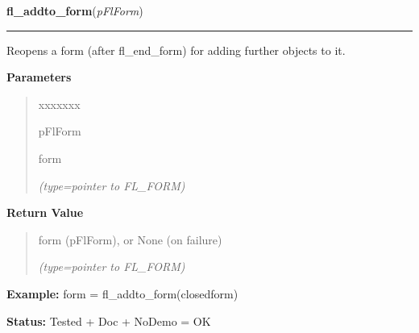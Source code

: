     \label{xformslib:flbasic:fl_addto_form}

    \vspace{0.5ex}

\hspace{.8\funcindent}\begin{boxedminipage}{\funcwidth}

    \raggedright \textbf{fl\_addto\_form}(\textit{pFlForm})

    \vspace{-1.5ex}

    \rule{\textwidth}{0.5\fboxrule}
\setlength{\parskip}{2ex}
    Reopens a form (after fl\_end\_form) for adding further objects to it.

\setlength{\parskip}{1ex}
      \textbf{Parameters}
      \vspace{-1ex}

      \begin{quote}
        \begin{Ventry}{xxxxxxx}

          \item[pFlForm]

          form

            {\it (type=pointer to FL\_FORM)}

        \end{Ventry}

      \end{quote}

      \textbf{Return Value}
    \vspace{-1ex}

      \begin{quote}
      form (pFlForm), or None (on failure)

      {\it (type=pointer to FL\_FORM)}

      \end{quote}

\textbf{Example:} form = fl\_addto\_form(closedform)



\textbf{Status:} Tested + Doc + NoDemo = OK



    \end{boxedminipage}

    \label{xformslib:flbasic:fl_make_object}

